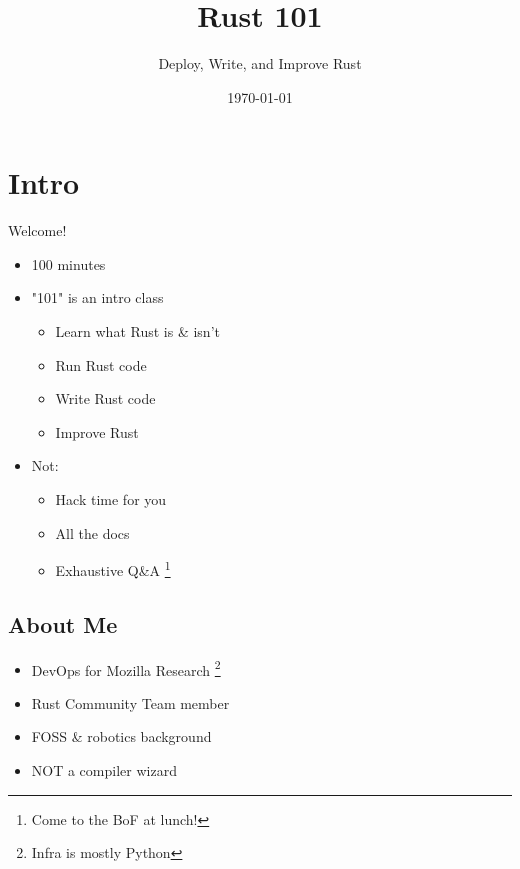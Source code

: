 \documentclass[50pt]{beamer}
\title[Rust 101]{Rust 101}
\subtitle{Deploy, Write, and Improve Rust}
\author{\name}
\date{\today}
\begin{document}
\begin{frame}
\titlepage
\end{frame}

\section{Intro}

    \begin{frame}
        Welcome!
         \begin{itemize}
            \item 100 minutes
            \item "101" is an intro class
            \begin{itemize}
                \item Learn what Rust is \& isn't
                \item Run Rust code
                \item Write Rust code
                \item Improve Rust
            \end{itemize}
            \item Not:
            \begin{itemize}
                \item Hack time for you
                \item All the docs
                \item Exhaustive Q\&A \footnote{Come to the BoF at lunch!}
            \end{itemize}
        \end{itemize}
    \end{frame}

    \subsection{About Me}

    \begin{frame}
        \begin{itemize}
            \item DevOps for Mozilla Research \footnote{Infra is mostly Python}
            \item Rust Community Team member
            \item FOSS \& robotics background
            \item NOT a compiler wizard
        \end{itemize}
    \end{frame}
\end{document}
